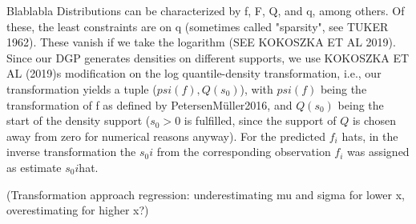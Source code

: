 Blablabla
Distributions can be characterized by f, F, Q, and q, among others. Of these, the least 
constraints are on q (sometimes called "sparsity", see TUKER 1962). These vanish if we
take the logarithm (SEE KOKOSZKA ET AL 2019). Since our DGP generates densities on
different supports, we use KOKOSZKA ET AL (2019)s modification on the log quantile-density
transformation, i.e., our transformation yields a tuple ($psi(f), Q(s_0)$), with
$psi(f)$ being the transformation of f as defined by {PetersenMüller2016}, and
$Q(s_0)$ being the start of the density support ($s_0 > 0$ is fulfilled, since the support
of $Q$ is chosen away from zero for numerical reasons anyway). For the predicted $f_i$ hats,
in the inverse transformation the $s_0i$ from the corresponding observation $f_i$ was
assigned as estimate $s_0i$hat.

(Transformation approach regression: underestimating mu and sigma for lower x,
overestimating for higher x?) \citet{PetersenLiuDivani2021}